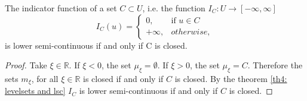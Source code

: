 \begin{example}
The indicator function of a set $C \subset U$, i.e. the function $I_C: U\rightarrow[-\infty, \infty]$
\begin{equation*}
I_C(u)=
\left\lbrace
	\begin{array}{rl}
	0, & \text{if } u \in C \\
	+\infty, & otherwise,
	\end{array}
\right.
\end{equation*}
is lower semi-continuous if and only if C is closed. 
\begin{proof}
	Take $\xi \in \mathbb{R}$.  If $\xi < 0$, the set $\mu_\xi=\emptyset$. If $\xi >0$, the set $\mu_\xi = C$. Therefore the sets $m_\xi$, for all $\xi \in \mathbb{R}$ is closed if and only if $C$ is closed. By the theorem \ref{th4: levelsets and lsc} $I_C$ is lower semi-continuous if and only if $C$ is closed.
\end{proof}
\end{example}
